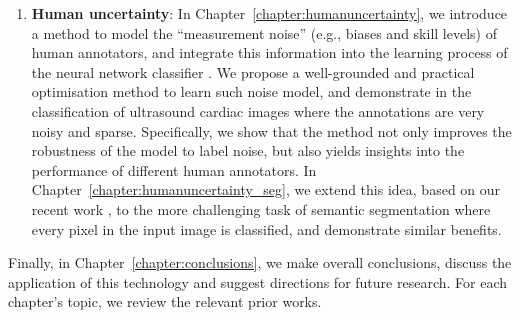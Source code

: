 \begin{enumerate}[label=(\alph*)]
	\item \textbf{Human uncertainty}: In Chapter~\ref{chapter:humanuncertainty}, we introduce a method to model the ``measurement noise'' (e.g., biases and skill levels) of human annotators, and integrate this information into the learning process of the neural network classifier \cite{tanno2019learning}. We propose a well-grounded and practical optimisation method to learn such noise model, and demonstrate in the classification of ultrasound cardiac images where the annotations are very noisy and sparse. Specifically, we show that the method not only improves the robustness of the model to label noise, but also yields insights into the performance of different human annotators. In Chapter~\ref{chapter:humanuncertainty_seg}, we 
extend this idea, based on our recent work \cite{zhang2020disentangling}, to the more challenging task of semantic segmentation where every pixel in the input image is classified, and demonstrate similar benefits. 

\end{enumerate}

Finally, in Chapter~\ref{chapter:conclusions}, we make overall conclusions, discuss the application of this technology and suggest directions for future research. For each chapter’s topic, we review the relevant prior works. 



